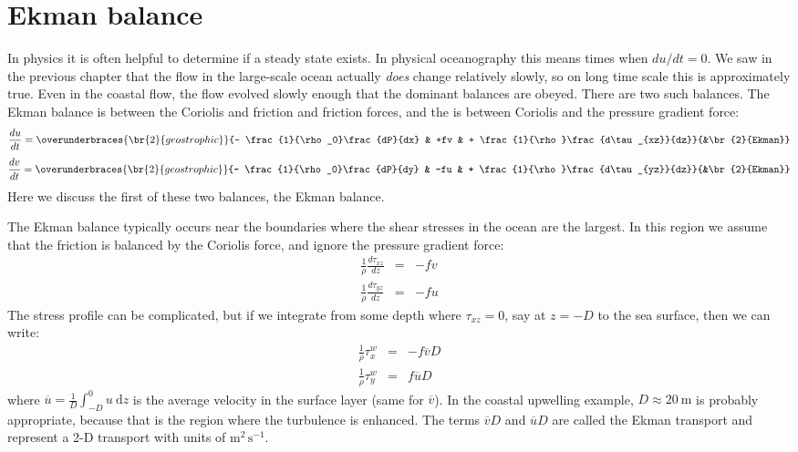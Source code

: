 \section{Ekman balance}
\label{sec:Ekman}

In physics it is often helpful to determine if a steady state exists.  In physical oceanography this means times when $du/dt=0$.  We saw in the previous chapter that the flow in the large-scale ocean actually \emph{does} change relatively slowly, so on long time scale this is approximately true.  Even in the coastal flow, the flow evolved slowly enough that the dominant balances are obeyed.  There are two such balances. The Ekman balance is  between the Coriolis and friction and friction forces, and the  is between Coriolis and the pressure gradient force: 
\begin{equation}
    \frac{du}{dt} = \overunderbraces{\br{2}{geostrophic}}
    {- \frac{1}{\rho_0}\frac{dP}{dx} & +fv & + \frac{1}{\rho}\frac{d\tau_{xz}}{dz}}
    {&\br{2}{Ekman}}
\end{equation}
\begin{equation}
    \frac{dv}{dt} = \overunderbraces{\br{2}{geostrophic}}
    {- \frac{1}{\rho_0}\frac{dP}{dy} & -fu & + \frac{1}{\rho}\frac{d\tau_{yz}}{dz}}
    {&\br{2}{Ekman}}
\end{equation}
Here we discuss the first of these two balances, the Ekman balance.

The Ekman balance typically occurs near the boundaries where the shear stresses in the ocean are the largest.  In this region we assume that the friction is balanced by the Coriolis force, and ignore the pressure gradient force:
\begin{eqnarray}
   \frac{1}{\rho} \frac{d\tau_{xz}}{dz} & = & -fv\\
    \frac{1}{\rho}\frac{d\tau_{yz}}{dz} & = & -fu
\end{eqnarray}
The stress profile can be complicated, but if we integrate from some depth where $\tau_{xz}=0$, say at $z=-D$ to the sea surface, then we can write:
\begin{eqnarray}
    \frac{1}{\rho}\tau_x^w & = & -f\overline{v}D\\
    \frac{1}{\rho}\tau_y^w & = & f\overline{u}D
\end{eqnarray}
where $\overline{u} = \frac{1}{D}\int_{-D}^0 u\ \mathrm{d}z$ is the average velocity in the surface layer (same for $\overline{v}$).  In the coastal upwelling example, $D\approx20\ \mathrm{m}$ is probably appropriate, because that is the region where the turbulence is enhanced.  The terms $\overline{v}D$ and $\overline{u}D$ are called the Ekman transport and represent a 2-D transport with units of $\mathrm{m^2\,s^{-1}}$. 

